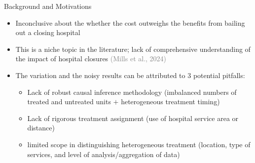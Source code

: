 \documentclass{beamer}
\theoremstyle{definition}
\begin{document}
\begin{frame}{Background and Motivations}

\begin{itemize}
    \setlength{\itemsep}{18pt} %
    \item Inconclusive about the whether the cost outweighs the benefits from bailing out a closing hospital 

    \item This is a niche topic in the literature; lack of comprehensive understanding of the impact of hospital closures \textcolor{gray}{(Mills et al., 2024)}
    
    \item The variation and the noisy results can be attributed to 3 potential pitfalls:
    \begin{itemize}
        \setlength{\itemsep}{6pt}
        \item Lack of robust causal inference methodology (imbalanced numbers of treated and untreated units $+$ heterogeneous treatment timing) 
        \item Lack of rigorous treatment assignment (use of hospital service area or distance) %
        \item limited scope in distinguishing heterogeneous treatment (location, type of services, and level of analysis/aggregation of data)
    \end{itemize}
\end{itemize}

    
\end{frame}
\end{document}

